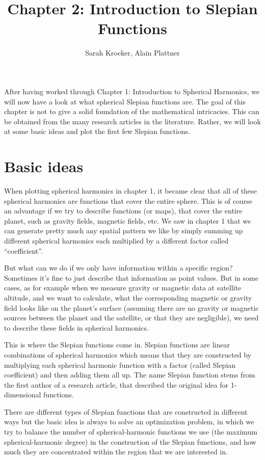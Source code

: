 \documentclass[11pt]{article}
\title{Chapter 2: Introduction to Slepian Functions}
\author{Sarah Kroeker, Alain Plattner}
\begin{document}
\maketitle

After having worked through Chapter 1: Introduction to Spherical
Harmonics, we will now have a look at what spherical Slepian functions
are. The goal of this chapter is not to give a solid foundation of the
mathematical intricacies. This can be obtained from the many research
articles in the literature. Rather, we will look at some basic ideas
and plot the first few Slepian functions.


\section{Basic ideas}
When plotting spherical harmonics in chapter 1, it became clear that
all of these spherical harmonics are functions that cover the entire
sphere. This is of course an advantage if we try to describe functions
(or maps), that cover the entire planet, such as gravity fields,
magnetic fields, etc. We saw in chapter 1 that we can generate pretty
much any spatial pattern we like by simply summing up different
spherical harmonics each multiplied by a different factor called
``coefficient''.

But what can we do if we only have information within a specific
region? Sometimes it's fine to just describe that information as
point values. But in some cases, as for example when we measure
gravity or magnetic data at satellite altitude, and we want to
calculate, what the corresponding magnetic or gravity field looks like
on the planet's surface (assuming there are no gravity or magnetic
sources between the planet and the satellite, or that they are
negligible), we need to describe these fields in spherical harmonics.

This is where the Slepian functions come in. Slepian functions are
linear combinations of spherical harmonics which means that they are
constructed by multiplying each spherical harmonic function with a
factor (called Slepian coefficient) and then adding them all up. The name
Slepian function stems from the first author of a research article,
that described the original idea for 1-dimensional functions.

There are different types of Slepian functions that are constructed in
different ways but the basic idea is always to solve an optimization
problem, in which we try to balance the number of spherical-harmonic
functions we use (the maximum spherical-harmonic degree) in the
construction of the Slepian functions, and how much they are
concentrated within the region that we are interested in.
\end{document}
